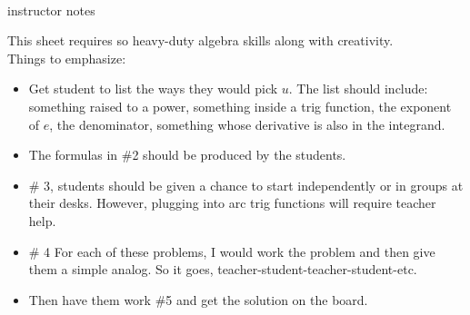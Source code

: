 \documentclass[11pt,fleqn]{article}
\begin{document}
\vspace*{-0.7in}

\begin{center}
  \Large{}\\
  instructor notes
  \end{center}

This sheet requires so heavy-duty algebra skills  along with creativity. \\

Things to emphasize:
\begin{itemize}
\item Get student to list the ways they would pick $u$. The list should include: something raised to a power, something inside a trig function, the exponent of $e$, the denominator, something whose derivative is also in the integrand.\\

\item The formulas in \#2 should be produced by the students. 

\item \# 3, students should be given a chance to start independently or in groups at their desks. However, plugging into arc trig functions will require teacher help.

\item \# 4 For each of these problems, I would work the problem and then give them a simple analog. So it goes, teacher-student-teacher-student-etc.

\item Then have them work \#5 and get the solution on the board.

\end{itemize}
\end{document}
